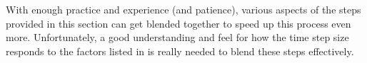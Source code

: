 
With enough practice and experience (and patience), various aspects of the steps
provided in this section can get blended together to speed up this process even
more.
%
Unfortunately, a good understanding and feel for how the time step size responds
to the factors listed in  is really needed
to blend these steps effectively.



